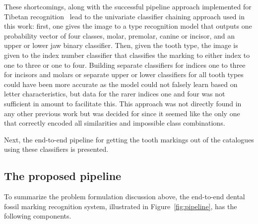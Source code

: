\documentclass[english,twoside,openright]{UH_DS_MSc}
\begin{document}
These shortcomings, along with the successful pipeline approach implemented for Tibetan recognition~\cite{4zhaoTibetan}
lead to the univariate classifier chaining approach used in this work: first, one gives the image to a type recognition 
model that outputs one probability vector of four classes, molar, premolar, canine or incisor, and an upper or lower jaw 
binary classifier. Then, given the tooth type, the image is given to the index number classifier that classifies the marking 
to either index to one to three or one to four. Building separate classifiers for indices one to three for incisors and molars
or separate upper or lower classifiers for all tooth types 
could have been more accurate as the model could not falsely learn based on letter characteristics, but data for the rarer indices 
one and four was not sufficient in amount to facilitate this.
This approach was not directly found in any other previous work but was decided 
for since it seemed like the only one that correctly encoded all similarities and impossible class combinations. 

Next, the end-to-end pipeline for getting the tooth markings out of the catalogues using these classifiers is presented.

\subsection{The proposed pipeline}
\label{sect:pipeline}
   
To summarize the problem formulation discussion above, the end-to-end dental fossil marking recognition system,
illustrated in Figure~\ref{fig:pipeline}, has 
the following components. 
\end{document}
